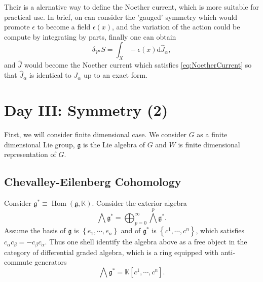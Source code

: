 \documentclass[10pt]{article}
\newcommand{\Hom}{\operatorname{Hom}}
\begin{document}
Their is a alernative way to define the Noether current, which is more suitable for practical use. In brief, on can consider the 'gauged' symmetry which would promote $ \epsilon$ to become a field $ \epsilon(x)$, and the variation of the action could be compute by integrating by parts, finally one can obtain
\begin{equation*}
  \delta_{V^{\alpha}} S = \int _{X} - \epsilon(x) \mathrm{d} \hat{J}_{\alpha},
\end{equation*}
and $ \hat{J}$ would become the Noether current which satisfies \eqref{eq:NoetherCurrent} so that $ \hat{J}_{\alpha}$ is identical to $ J_{\alpha}$ up to an exact form.

\section{Day III: Symmetry (2)}

First, we will consider finite dimensional case. We consider $ G$ as a finite dimensional Lie group, $ \mathfrak{g} $ is the Lie algebra of $ G$ and $ W$ is finite dimensional representation of $ G$.

\subsection{Chevalley-Eilenberg Cohomology}

Consider $ \mathfrak{g}^{*} \equiv \Hom(\mathfrak{g}, \mathbb{K})$. Consider the exterior algebra
\begin{equation*}
  \bigwedge \mathfrak{g}^{*} = \bigoplus_{p=0}^{\infty } \bigwedge^{p} \mathfrak{g}^{*}.
\end{equation*}
Assume the basis of $ \mathfrak{g}$ is $\left\{ e_1,\cdots ,e_{n} \right\}$ and of $ \mathfrak{g}^{*}$ is $\left\{ c^{1},\cdots ,c^{n} \right\}$, which satisfies $ c_{\alpha} c_{\beta} = - c_{\beta} c_{\alpha}$. Thus one shell identify the algebra above as a free object in the category of differential graded algebra, which is a ring equipped with anti-commute generators
\begin{equation*}
  \bigwedge \mathfrak{g}^{*} = \mathbb{K}[c^{1},\cdots ,c^{n}].
\end{equation*}
\end{document}
